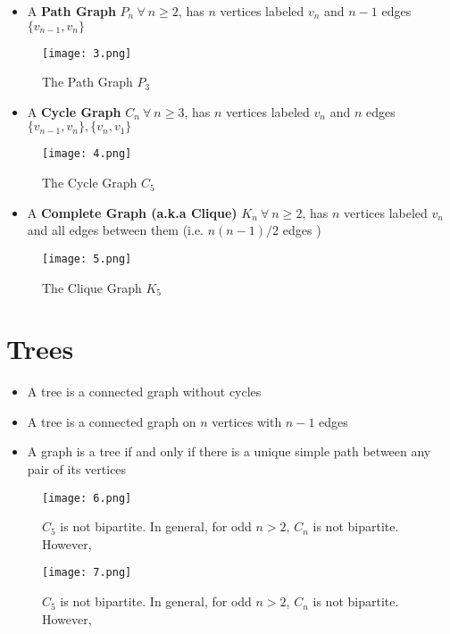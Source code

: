 \begin{itemize}
\item A \textbf{Path Graph} $P_{n} \ \forall \ n \geq 2$, has $n$ vertices labeled $v_{n}$ and $n-1$ edges $\{v_{n-1}, v_{n}\}$
\end{itemize}
\begin{figure}[h]\label{fig_3}
	\centering
	\texttt{[image: 3.png]}
	\caption{The Path Graph $P_{3}$}
\end{figure}
\begin{itemize}
\item A \textbf{Cycle Graph} $C_{n} \ \forall \ n \geq 3$, has $n$ vertices labeled $v_{n}$ and $n$ edges $\{v_{n-1}, v_{n}\},\{v_{n}, v_{1}\}$
\end{itemize}
\begin{figure}[h]\label{fig_4}
	\centering
	\texttt{[image: 4.png]}
	\caption{The Cycle Graph $C_{5}$}
\end{figure}
\pagebreak
\begin{itemize}
	\item A \textbf{Complete Graph (a.k.a Clique)} $K_{n} \ \forall \ n \geq 2$, has $n$ vertices labeled $v_{n}$ and all edges between them (i.e. $n(n-1)/2$ edges )
\end{itemize}
\begin{figure}[h]\label{fig_5}
	\centering
	\texttt{[image: 5.png]}
	\caption{The Clique Graph $K_{5}$}
\end{figure}
\section{Trees}
\begin{itemize}
\item A tree is a connected graph without cycles
\item A tree is a connected graph on $n$ vertices with $n - 1$ edges
\item A graph is a tree if and only if there is a unique simple path between any pair of its vertices
\end{itemize}
\begin{figure}[h]\label{fig_2}
	\centering
	\texttt{[image: 6.png]}
	\caption{$C_{5}$ is not bipartite. In general, for odd $n > 2$, $C_{n}$ is not bipartite. However, }
\end{figure}
\begin{figure}[h]\label{fig_2}
	\centering
	\texttt{[image: 7.png]}
	\caption{$C_{5}$ is not bipartite. In general, for odd $n > 2$, $C_{n}$ is not bipartite. However, }
\end{figure}
